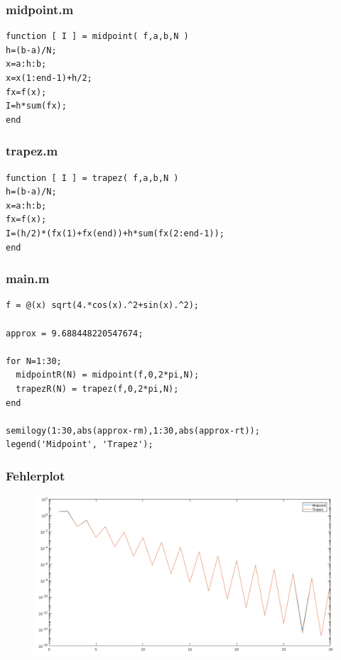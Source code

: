 \documentclass[ngerman,12pt]{article}
\begin{document}
\lstset{language=Matlab,basicstyle=\ttfamily,columns=fixed}
\subsubsection*{midpoint.m}
\begin{lstlisting}[frame=single]
function [ I ] = midpoint( f,a,b,N )
h=(b-a)/N;
x=a:h:b;
x=x(1:end-1)+h/2;
fx=f(x);
I=h*sum(fx);
end
\end{lstlisting}

\subsubsection*{trapez.m}
\begin{lstlisting}[frame=single]
function [ I ] = trapez( f,a,b,N )
h=(b-a)/N;
x=a:h:b;
fx=f(x);
I=(h/2)*(fx(1)+fx(end))+h*sum(fx(2:end-1));
end
\end{lstlisting}

\subsubsection*{main.m}
\begin{lstlisting}[frame=single]
f = @(x) sqrt(4.*cos(x).^2+sin(x).^2);

approx = 9.688448220547674;

for N=1:30;
  midpointR(N) = midpoint(f,0,2*pi,N);
  trapezR(N) = trapez(f,0,2*pi,N);
end

semilogy(1:30,abs(approx-rm),1:30,abs(approx-rt));
legend('Midpoint', 'Trapez');
\end{lstlisting}


\subsubsection*{Fehlerplot}
\begin{figure}[H]
    \includegraphics[width=\linewidth,keepaspectratio]{result_crop.png}
\end{figure}
\end{document}
